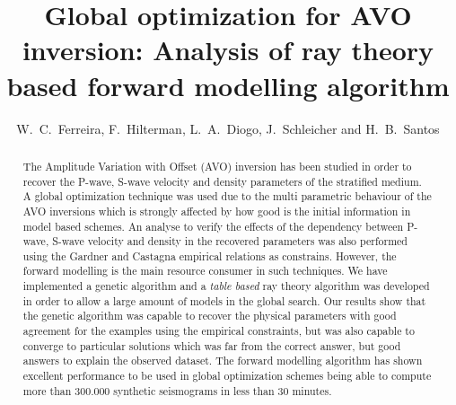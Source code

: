 \documentclass{vie16}
\begin{document}
\title{Global optimization for AVO inversion: Analysis of ray theory based 
forward modelling algorithm}
\author{W.~C.~Ferreira, F.~Hilterman, L.~A.~Diogo, J.~Schleicher and 
H.~B.~Santos}
\maketitle

\begin{abstract}
The Amplitude Variation with Offset (AVO) inversion has been studied in 
order to recover the P-wave, S-wave velocity and density parameters of the 
stratified medium. A global optimization technique was used due to the 
multi parametric behaviour of the AVO inversions which is strongly affected 
by how good is the initial information in model based schemes. An analyse 
to verify the effects of the dependency between P-wave, S-wave velocity 
and density in the recovered parameters was also performed using the 
Gardner and Castagna empirical relations as constrains. However, the 
forward modelling is the main resource consumer in such techniques. 
We have implemented a genetic algorithm and a \textit{table 
based} ray theory algorithm was developed in order to allow a large amount 
of models in the global search. Our results show that the genetic algorithm 
was capable to recover the physical parameters with good agreement for the 
examples using the empirical constraints, but was also capable to converge 
to particular solutions which was far from the correct answer, but good 
answers to explain the observed dataset. The forward modelling algorithm 
has shown excellent performance to be used in global optimization schemes 
being able to compute more than 300.000 synthetic seismograms in less 
than 30 minutes.
\end{abstract}

\newpage
\end{document}
